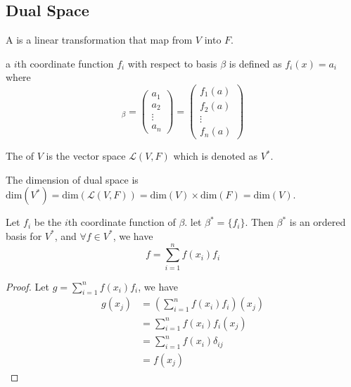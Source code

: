 \subsection{Dual Space}


\begin{definition}
	A  is a linear transformation that map from $V$ into $F$.
\end{definition}

\begin{definition}
	a $i$th coordinate function $f_i$ with respect to basis $\beta$ is defined as $f_i(x) = a_i$ where
	\begin{equation*}
		[x]_\beta = \begin{pmatrix}
			a_1 \\
			a_2 \\
			\vdots \\
			a_n
		\end{pmatrix} = \begin{pmatrix}
			f_1(a) \\
			f_2(a) \\
			\vdots \\
			f_n(a)
		\end{pmatrix}
	\end{equation*}
\end{definition}



\begin{definition}
	The  of $V$ is the vector space $\mathcal{L}(V,F)$ which is denoted as $V^*$.
\end{definition}


The dimension of dual space is $\text{dim}(V^*)=\text{dim}(\mathcal{L}(V,F)) = \text{dim}(V) \times \text{dim}(F) = \text{dim}(V)$.

\begin{definition}
	Let $f_i$ be the $i$th coordinate function of $\beta$. let $\beta^*=\{f_i\}$. Then $\beta^*$ is an ordered basis for $V^*$, and $\forall f \in V^*$, we have
	\begin{equation}
		f = \sum_{i=1}^n f(x_i) f_i
	\end{equation}
\end{definition}
\begin{proof}
	Let $g = \sum\limits_{i=1}^n f(x_i) f_i$, we have
	\begin{equation*}
		\begin{aligned}
			g(x_j) &= \left( \sum_{i=1}^n f(x_i) f_i \right) (x_j) \\
			&= \sum_{i=1}^n f(x_i) f_i (x_j) \\
			&= \sum_{i=1}^n f(x_i) \delta_{ij} \\
			&= f(x_j)
		\end{aligned}
	\end{equation*}
\end{proof}


